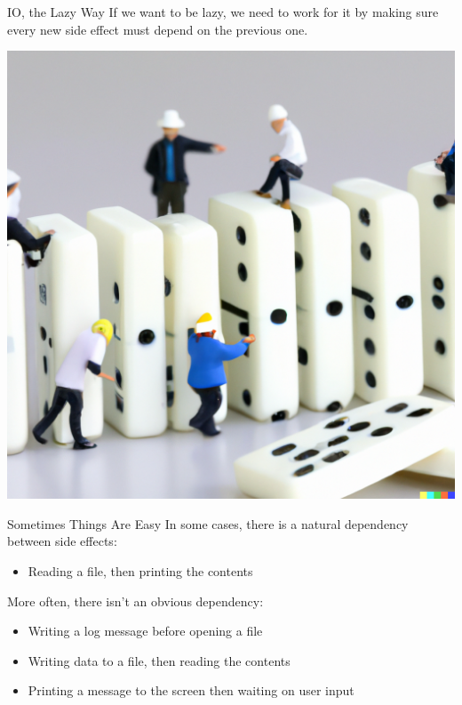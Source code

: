 \documentclass[10pt, presentation, colorlinks]{beamer}
\begin{document}
\begin{frame}[label={sec:org2258334}]{IO, the Lazy Way}
If we want to be lazy, we need to work for it by making sure every new
side effect \alert{must depend on} the previous one.

\begin{center}
\includegraphics[height=0.6\textheight]{./img/dominos.png}
\end{center}
\end{frame}

\begin{frame}[label={sec:org2f3f09a}]{Sometimes Things Are Easy}
In some cases, there is a natural dependency between side effects:

\bigskip
\pause
\begin{itemize}
\item Reading a file, then printing the contents
\end{itemize}

\bigskip
\pause
More often, there isn't an obvious dependency:

\bigskip
\pause
\begin{itemize}
\item Writing a log message before opening a file
\item Writing data to a file, then reading the contents
\item Printing a message to the screen then waiting on user input
\end{itemize}
\end{frame}
\end{document}
